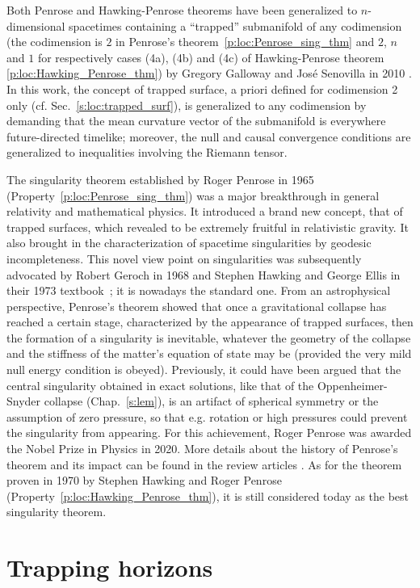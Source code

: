 \begin{remark}
Both Penrose and Hawking-Penrose theorems have been generalized to $n$-dimensional spacetimes containing a ``trapped'' submanifold
of any codimension (the codimension is $2$ in Penrose's theorem~\ref{p:loc:Penrose_sing_thm}
and $2$, $n$ and $1$ for respectively cases (4a), (4b) and (4c) of Hawking-Penrose theorem \ref{p:loc:Hawking_Penrose_thm}) by Gregory Galloway and
José Senovilla in 2010 \cite{GalloS10}.
In this work,
the concept of trapped surface, a priori defined for
codimension 2 only (cf. Sec.~\ref{s:loc:trapped_surf}), is generalized to any codimension
by demanding that the mean curvature vector of the submanifold is everywhere future-directed timelike; moreover, the null and causal convergence conditions
are generalized to inequalities involving the Riemann tensor.
\end{remark}

\begin{hist}
The singularity theorem established by Roger Penrose
in 1965 \cite{Penro65} (Property~\ref{p:loc:Penrose_sing_thm})
was a major breakthrough in general relativity and mathematical physics.
It introduced a brand new concept, that of trapped surfaces, which revealed to
be extremely fruitful in relativistic gravity. It also brought in the characterization of
spacetime singularities by geodesic incompleteness. This novel view point on
singularities was subsequently advocated by Robert Geroch
in 1968 \cite{Geroc68} and Stephen Hawking and George Ellis in their 1973 textbook~\cite{HawkiE73}; it is nowadays the standard one. From an astrophysical perspective, Penrose's theorem showed that
once a gravitational collapse has reached a certain stage, characterized by the appearance
of trapped surfaces, then the formation of a singularity is inevitable, whatever the
geometry of the collapse and the stiffness of the matter's equation of state may be (provided
the very mild null energy condition is obeyed). Previously, it could have been
argued that the central singularity obtained in exact solutions, like that
of the Oppenheimer-Snyder collapse (Chap.~\ref{s:lem}), is an artifact of spherical
symmetry or the assumption of zero pressure, so that e.g. rotation or high pressures could
prevent the singularity from appearing. For this achievement, Roger Penrose was awarded the Nobel Prize in Physics in 2020.
More details about the history of Penrose's theorem and its impact can be found
in the review articles \cite{Senov22a,Senov22b,SenovG15,Lands22}.
As for the theorem
proven in 1970 by Stephen Hawking  and
Roger Penrose \cite{HawkiP70} (Property~\ref{p:loc:Hawking_Penrose_thm}),
it is still considered today as the best singularity theorem.
\end{hist}



\section{Trapping horizons}


